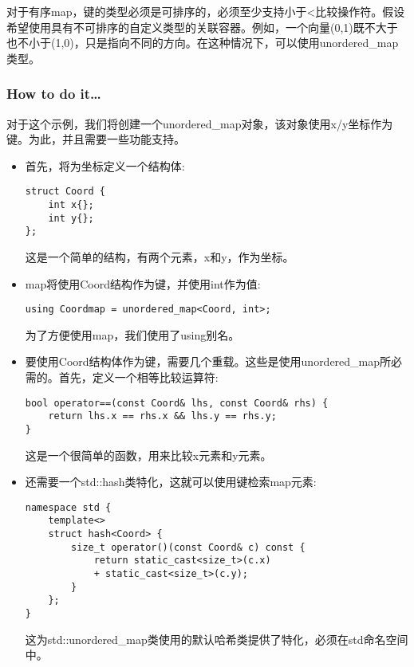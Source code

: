 
对于有序map，键的类型必须是可排序的，必须至少支持小于<比较操作符。假设希望使用具有不可排序的自定义类型的关联容器。例如，一个向量(0,1)既不大于也不小于(1,0)，只是指向不同的方向。在这种情况下，可以使用unordered\_map类型。

\subsubsection{How to do it…}

对于这个示例，我们将创建一个unordered\_map对象，该对象使用x/y坐标作为键。为此，并且需要一些功能支持。

\begin{itemize}
\item 
首先，将为坐标定义一个结构体:

\begin{lstlisting}[style=styleCXX]
struct Coord {
	int x{};
	int y{};
};
\end{lstlisting}

这是一个简单的结构，有两个元素，x和y，作为坐标。

\item 
map将使用Coord结构作为键，并使用int作为值:

\begin{lstlisting}[style=styleCXX]
using Coordmap = unordered_map<Coord, int>;
\end{lstlisting}

为了方便使用map，我们使用了using别名。

\item 
要使用Coord结构体作为键，需要几个重载。这些是使用unordered\_map所必需的。首先，定义一个相等比较运算符:

\begin{lstlisting}[style=styleCXX]
bool operator==(const Coord& lhs, const Coord& rhs) {
	return lhs.x == rhs.x && lhs.y == rhs.y;
}
\end{lstlisting}

这是一个很简单的函数，用来比较x元素和y元素。

\item 
还需要一个std::hash类特化，这就可以使用键检索map元素:

\begin{lstlisting}[style=styleCXX]
namespace std {
	template<>
	struct hash<Coord> {
		size_t operator()(const Coord& c) const {
			return static_cast<size_t>(c.x)
			+ static_cast<size_t>(c.y);
		}
	};
}
\end{lstlisting}

这为std::unordered\_map类使用的默认哈希类提供了特化，必须在std命名空间中。


\end{itemize}
